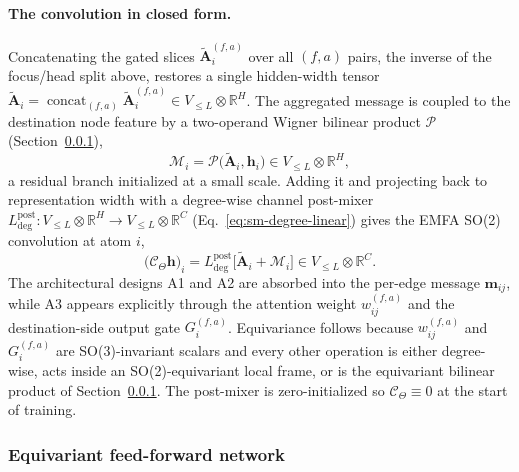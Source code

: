 \paragraph{The convolution in closed form.}
Concatenating the gated slices $\widetilde{\mathbf A}_i^{(f,a)}$ over all $(f,a)$ pairs, the inverse of the focus/head split above, restores a single hidden-width tensor $\widetilde{\mathbf A}_i=\operatorname{concat}_{(f,a)}\widetilde{\mathbf A}_i^{(f,a)}\in V_{\le L}\otimes\mathbb{R}^{H}$.
The aggregated message is coupled to the destination node feature by a two-operand Wigner bilinear product $\mathcal{P}$ (Section~\ref{sec:s2-method}),
\begin{equation}
    \mathcal{M}_i
    = \mathcal{P}\bigl(\widetilde{\mathbf A}_i,\mathbf{h}_i\bigr)
    \in V_{\le L}\otimes\mathbb{R}^{H},
    \label{eq:dpa4-message-node}
\end{equation}
a residual branch initialized at a small scale.
Adding it and projecting back to representation width with a degree-wise channel post-mixer $L^{\mathrm{post}}_{\mathrm{deg}}:V_{\le L}\otimes\mathbb{R}^{H}\to V_{\le L}\otimes\mathbb{R}^{C}$ (Eq.~\eqref{eq:sm-degree-linear}) gives the EMFA SO(2) convolution at atom $i$,
\begin{equation}
    \bigl(\mathcal{C}_{\Theta}\mathbf{h}\bigr)_i
    =
    L^{\mathrm{post}}_{\mathrm{deg}}\bigl[\widetilde{\mathbf A}_i+\mathcal{M}_i\bigr]
    \in V_{\le L}\otimes\mathbb{R}^{C}.
    \label{eq:dpa4-conv}
\end{equation}
The architectural designs A1 and A2 are absorbed into the per-edge message $\mathbf{m}_{ij}$, while A3 appears explicitly through the attention weight $w_{ij}^{(f,a)}$ and the destination-side output gate $G_i^{(f,a)}$.
Equivariance follows because $w_{ij}^{(f,a)}$ and $G_i^{(f,a)}$ are SO(3)-invariant scalars and every other operation is either degree-wise, acts inside an SO(2)-equivariant local frame, or is the equivariant bilinear product of Section~\ref{sec:s2-method}.
The post-mixer is zero-initialized so $\mathcal{C}_{\Theta}\equiv 0$ at the start of training.

\subsubsection{Equivariant feed-forward network}
\label{sec:s2-method}

